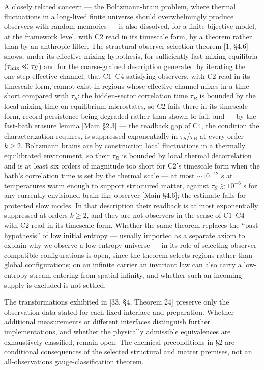 \documentclass[
]{article}
\begin{document}
A closely related concern --- the Boltzmann-brain problem, where thermal
fluctuations in a long-lived finite universe should overwhelmingly
produce observers with random memories --- is also dissolved, for a
finite bijective model, at the framework level, with C2 read in its
timescale form, by a theorem rather than by an anthropic filter. The
structural observer-selection theorem {[}1, §4.6{]} shows, under its
effective-mixing hypothesis, for sufficiently fast-mixing equilibria
(\(\tau_{\rm mix} \ll \tau_S\)) and for the coarse-grained description
generated by iterating the one-step effective channel, that
C1--C4-satisfying observers, with C2 read in its timescale form, cannot
exist in regions whose effective channel mixes in a time short compared
with \(\tau_S\): the hidden-sector correlation time \(\tau_B\) is
bounded by the local mixing time on equilibrium microstates, so C2 fails
there in its timescale form, record persistence being degraded rather
than shown to fail, and --- by the fast-bath erasure lemma {[}Main
§2.3{]} --- the readback gap of C4, the condition the characterization
requires, is suppressed exponentially in \(\tau_S/\tau_B\) at every
order \(k \geq 2\). Boltzmann brains are by construction local
fluctuations in a thermally equilibrated environment, so their
\(\tau_B\) is bounded by local thermal decorrelation and is at least six
orders of magnitude too short for C2's timescale form when the bath's
correlation time is set by the thermal scale --- at most
\(\sim 10^{-12}\) s at temperatures warm enough to support structured
matter, against \(\tau_S \gtrsim 10^{-6}\) s for any currently
envisioned brain-like observer {[}Main §4.6{]}; the estimate fails for
protected slow modes. In that description their readback is at most
exponentially suppressed at orders \(k \geq 2\), and they are not
observers in the sense of C1--C4 with C2 read in its timescale form.
Whether the same theorem replaces the ``past hypothesis'' of low initial
entropy --- usually imported as a separate axiom to explain why we
observe a low-entropy universe --- in its role of selecting
observer-compatible configurations is open, since the theorem selects
regions rather than global configurations; on an infinite carrier an
invariant law can also carry a low-entropy stream entering from spatial
infinity, and whether such an incoming supply is excluded is not
settled.

The transformations exhibited in {[}33, §4, Theorem 24{]} preserve only
the observation data stated for each fixed interface and preparation.
Whether additional measurements or different interfaces distinguish
further implementations, and whether the physically admissible
equivalences are exhaustively classified, remain open. The chemical
preconditions in §2 are conditional consequences of the selected
structural and matter premises, not an all-observations
gauge-classification theorem.
\end{document}
